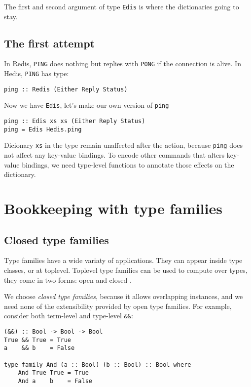 \documentclass[pldi]{sigplanconf-pldi16}
\begin{document}
The first and second argument of type \texttt{Edis} is where the
dictionaries going to stay.

\subsection{The first attempt}

In Redis, \texttt{PING} does nothing but replies with
\texttt{PONG} if the connection is alive. In Hedis,
\texttt{PING} has type:

\begin{verbatim}
ping :: Redis (Either Reply Status)
\end{verbatim}

Now we have \texttt{Edis}, let's make our own version of
\texttt{ping}\footnotemark

\begin{verbatim}
ping :: Edis xs xs (Either Reply Status)
ping = Edis Hedis.ping
\end{verbatim}

Dicionary \texttt{xs} in the type remain unaffected after the
action, because \texttt{ping} does not affect any key-value
bindings. To encode other commands that alters key-value bindings, we need
 type-level functions to annotate those effects on the dictionary.

\section{Bookkeeping with type families}
\subsection{Closed type families}

Type families have a wide variaty of applications. They can appear inside type
classes\cite{tfclass}\cite{tfsynonym}, or at toplevel. Toplevel type families
can be used to compute over types, they come in two forms: open\cite{tfopen} and
closed \cite{tfclosed}.

We choose \emph{closed type families}, because it allows overlapping instances,
and we need none of the extensibility provided by open type families.
For example, consider both term-level and type-level \texttt{&&}:

\begin{verbatim}
(&&) :: Bool -> Bool -> Bool
True && True = True
a    && b    = False

type family And (a :: Bool) (b :: Bool) :: Bool where
    And True True = True
    And a    b    = False
\end{verbatim}
\end{document}
